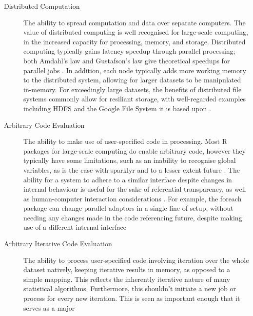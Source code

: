 \documentclass[a4paper,10pt]{article}
\begin{document}
\begin{description}
	\item[Distributed Computation]
	      The ability to spread computation and data over separate
	      computers.
	      The value of distributed computing is well recognised for
	      large-scale computing, in the increased capacity for
	      processing, memory, and storage.
	      Distributed computing typically gains latency speedup through
	      parallel processing; both Amdahl's law and Gustafson's law give
	      theoretical speedups for parallel jobs \cite{amdahl1967law}
	      \cite{gustafson1988law}.
	      In addition, each node typically adds more working memory to
	      the distributed system, allowing for larger datasets to be
	      manipulated in-memory.
	      For exceedingly large datasets, the benefits of distributed
	      file systems commonly allow for resiliant storage, with
	      well-regarded examples including HDFS and the Google File
	      System it is based upon \cite{shvachko2010hadoop}
	      \cite{ghemawat2003google}.
	\item[Arbitrary Code Evaluation]
	      The ability to make use of user-specified code in processing.
	      Most R packages for large-scale computing do enable arbitrary
	      code, however they typically have some limitations, such as an
	      inability to recognise global variables, as is the case with
	      sparklyr and to a lesser extent future
	      \cite{sparklyr2020limitations} \cite{microsoft20}.
	      The ability for a system to adhere to a similar interface
	      despite changes in internal behaviour is useful for the sake of
	      referential transparency, as well as human-computer interaction
	      considerations \cite{sondergaard1990Rtda}
	      \cite{norman2013design}.
	      For example, the foreach package can change parallel adaptors in
              a single line of setup, without needing any changes made in the
              code referencing future, despite making use of a different internal
              interface \cite{weston19:_using}
	\item[Arbitrary Iterative Code Evaluation]
	      The ability to process user-specified code involving iteration
	      over the whole dataset natively, keeping iterative results in
	      memory, as opposed to a simple mapping. 
	      This reflects the inherently iterative nature of many
	      statistical algorithms.
	      Furthermore, this shouldn't initiate a new job or process for
	      every new iteration.
	      This is seen as important enough that it serves as a major

\end{description}
\end{document}

